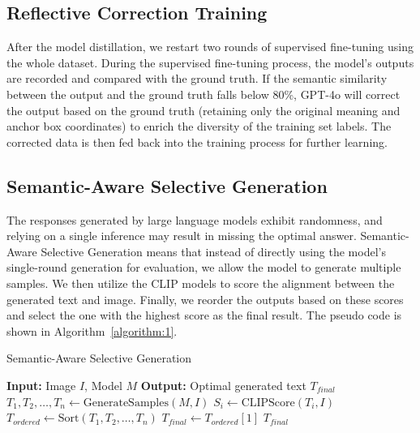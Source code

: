 \subsection{Reflective Correction Training}
After the model distillation, we restart two rounds of supervised fine-tuning using the whole dataset. During the supervised fine-tuning process, the model's outputs are recorded and compared with the ground truth. If the semantic similarity between the output and the ground truth falls below 80\%, GPT-4o will correct the output based on the ground truth (retaining only the original meaning and anchor box coordinates) to enrich the diversity of the training set labels. The corrected data is then fed back into the training process for further learning.

\subsection{Semantic-Aware Selective Generation}
The responses generated by large language models exhibit randomness, and relying on a single inference may result in missing the optimal answer.
Semantic-Aware Selective Generation means that instead of directly using the model's single-round generation for evaluation, we allow the model to generate multiple samples. We then utilize the CLIP models to score the alignment between the generated text and image. Finally, we reorder the outputs based on these scores and select the one with the highest score as the final result. The pseudo code is shown in Algorithm~\ref{algorithm:1}.
\begin{algorithm}[h!]
\caption{Semantic-Aware Selective Generation}
\begin{algorithmic}[1]
\STATE \textbf{Input:} Image $I$, Model $M$
\STATE \textbf{Output:} Optimal generated text $T_{final}$
\STATE  $T_1, T_2, \dots, T_n \gets \text{GenerateSamples}(M, I)$
    \STATE $S_i \gets \text{CLIPScore}(T_i, I)$
\ENDFOR
\STATE $T_{ordered} \gets \text{Sort}(T_1, T_2, \dots, T_n)$
\STATE $T_{final} \gets T_{ordered}[1]$
\RETURN $T_{final}$
\end{algorithmic}
\label{algorithm:1}
\end{algorithm}


